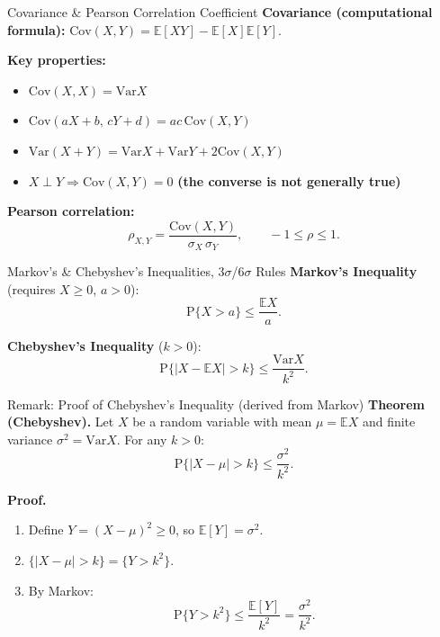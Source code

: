 \documentclass[12pt,a4paper]{article}
\newcommand{\E}{\mathbb{E}}
\newcommand{\Var}{\mathrm{Var}}
\newcommand{\Cov}{\mathrm{Cov}}
\renewcommand{\P}{\mathrm{P}}
\begin{document}
\vspace{4pt}

\begin{defbox}{Covariance \& Pearson Correlation Coefficient}
\textbf{Covariance (computational formula):}\quad
$\Cov(X,Y)=\E[XY]-\E[X]\E[Y]$.

\textbf{Key properties:}
\begin{itemize}[noitemsep, topsep=2pt]
  \item $\Cov(X,X)=\Var X$
  \item $\Cov(aX+b,\,cY+d)=ac\,\Cov(X,Y)$
  \item $\Var(X+Y)=\Var X+\Var Y+2\Cov(X,Y)$
  \item $X\perp Y \Rightarrow \Cov(X,Y)=0$
        \textbf{(the converse is not generally true)}
\end{itemize}

\textbf{Pearson correlation:}\quad
\[
\rho_{X,Y}=\dfrac{\Cov(X,Y)}{\sigma_X\,\sigma_Y},\qquad
-1\le\rho\le1.
\]
\end{defbox}

\vspace{4pt}

\begin{defbox}{Markov's \& Chebyshev's Inequalities, $3\sigma$/$6\sigma$ Rules}
\textbf{Markov's Inequality}\; (requires $X\ge0$, $a>0$):
\[
  \P\{X>a\}\le\frac{\E X}{a}.
\]

\textbf{Chebyshev's Inequality}\; ($k>0$):
\[
  \P\{|X-\E X|>k\}\le\frac{\Var X}{k^2}.
\]
\end{defbox}

\vspace{4pt}
\begin{proofbox}{Remark: Proof of Chebyshev's Inequality (derived from Markov)}
\textbf{Theorem (Chebyshev).}\;
Let $X$ be a random variable with mean $\mu=\E X$ and finite variance
$\sigma^2=\Var X$. For any $k>0$:
\[
  \P\{|X-\mu|>k\}\le\frac{\sigma^2}{k^2}.
\]

\textbf{Proof.}
\begin{enumerate}[leftmargin=*,itemsep=2pt]
  \item Define $Y=(X-\mu)^2\ge0$, so $\E[Y]=\sigma^2$.
  \item $\{|X-\mu|>k\}=\{Y>k^2\}$.
  \item By Markov:
  \[
    \P\{Y>k^2\}\le\frac{\E[Y]}{k^2}=\frac{\sigma^2}{k^2}.
  \]
\end{enumerate}
\end{proofbox}

\vspace{4pt}
\end{document}
